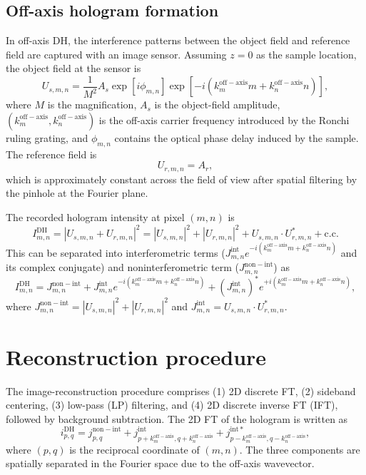 \subsection{Off-axis hologram formation}

In off-axis DH, the interference patterns between the object field and reference field are captured with an image sensor. Assuming $z = 0$ as the sample location, the object field at the sensor is
\begin{equation}
U_{s,m,n} = \frac{1}{M^2} A_s \exp[i\phi_{m,n}] \exp[-i(k_m^{\mathrm{off-axis}} m + k_n^{\mathrm{off-axis}} n)],
\end{equation}
where $M$ is the magnification, $A_s$ is the object-field amplitude, $(k_m^{\mathrm{off-axis}}, k_n^{\mathrm{off-axis}})$ is the off-axis carrier frequency introduced by the Ronchi ruling grating, and $\phi_{m,n}$ contains the optical phase delay induced by the sample. The reference field is
\begin{equation}
U_{r,m,n} = A_r,
\end{equation}
which is approximately constant across the field of view after spatial filtering by the pinhole at the Fourier plane.

The recorded hologram intensity at pixel $(m,n)$ is
\begin{equation}
I_{m,n}^{\mathrm{DH}} = \left|U_{s,m,n} + U_{r,m,n}\right|^2 = |U_{s,m,n}|^2 + |U_{r,m,n}|^2 + U_{s,m,n} \cdot U_{r,m,n}^* + \mathrm{c.c.}
\end{equation}
This can be separated into interferometric terms ($J_{m,n}^{\mathrm{int}} e^{-i(k_m^{\mathrm{off-axis}}m + k_n^{\mathrm{off-axis}}n)}$ and its complex conjugate) and noninterferometric term ($J_{m,n}^{\mathrm{non-int}}$) as
\begin{equation}
\label{eq:hologram_DH}
I_{m,n}^{\mathrm{DH}} = J_{m,n}^{\mathrm{non-int}} + J_{m,n}^{\mathrm{int}} e^{-i(k_m^{\mathrm{off-axis}}m + k_n^{\mathrm{off-axis}}n)} + (J_{m,n}^{\mathrm{int}})^* e^{+i(k_m^{\mathrm{off-axis}}m + k_n^{\mathrm{off-axis}}n)},
\end{equation}
where $J_{m,n}^{\mathrm{non-int}} = |U_{s,m,n}|^2 + |U_{r,m,n}|^2$ and $J_{m,n}^{\mathrm{int}} = U_{s,m,n} \cdot U_{r,m,n}^*$.

\section{Reconstruction procedure}

The image-reconstruction procedure comprises (1) 2D discrete FT, (2) sideband centering, (3) low-pass (LP) filtering, and (4) 2D discrete inverse FT (IFT), followed by background subtraction. The 2D FT of the hologram is written as
\begin{equation}
i_{p,q}^{\mathrm{DH}} = j_{p,q}^{\mathrm{non-int}} + j_{p+k_m^{\mathrm{off-axis}}, q+k_n^{\mathrm{off-axis}}}^{\mathrm{int}} + j_{p-k_m^{\mathrm{off-axis}}, q-k_n^{\mathrm{off-axis}}}^{\mathrm{int}*},
\end{equation}
where $(p,q)$ is the reciprocal coordinate of $(m,n)$. The three components are spatially separated in the Fourier space due to the off-axis wavevector.

